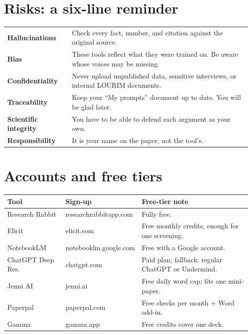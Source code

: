 \documentclass[11pt,a4paper]{article}
\begin{document}
\section{Risks: a six-line reminder}
\label{sec:risks}

\begin{center}
\small
\begin{tabularx}{\linewidth}{@{}l X@{}}
\toprule
\textbf{Hallucinations} & Check every fact, number, and citation against the original source. \\
\textbf{Bias} & These tools reflect what they were trained on. Be aware whose voices may be missing. \\
\textbf{Confidentiality} & Never upload unpublished data, sensitive interviews, or internal LOURIM documents. \\
\textbf{Traceability} & Keep your ``My prompts'' document up to date. You will be glad later. \\
\textbf{Scientific integrity} & You have to be able to defend each argument as your own. \\
\textbf{Responsibility} & It is your name on the paper, not the tool's. \\
\bottomrule
\end{tabularx}
\end{center}

\appendix

\section{Accounts and free tiers}
\label{app:accounts}

\begin{center}
\small
\begin{tabularx}{\linewidth}{@{}l l X@{}}
\toprule
\textbf{Tool} & \textbf{Sign-up} & \textbf{Free-tier note} \\
\midrule
Research Rabbit   & researchrabbitapp.com  & Fully free. \\
Elicit            & elicit.com             & Free monthly credits, enough for one screening. \\
NotebookLM        & notebooklm.google.com  & Free with a Google account. \\
ChatGPT Deep Res. & chatgpt.com            & Paid plan; fallback: regular ChatGPT or Undermind. \\
Jenni AI          & jenni.ai               & Free daily word cap; fits one mini-paper. \\
Paperpal          & paperpal.com           & Free checks per month + Word add-in. \\
Gamma             & gamma.app              & Free credits cover one deck. \\
\bottomrule
\end{tabularx}
\end{center}
\end{document}
